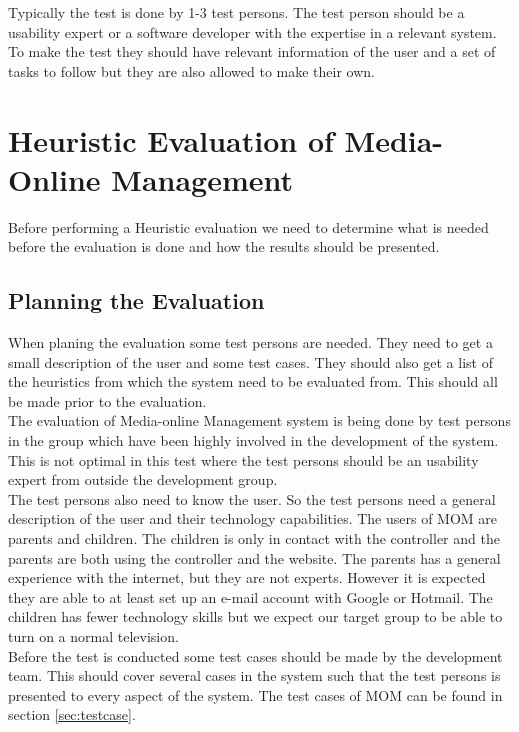 Typically the test is done by 1-3 test persons\citep{HeuristicEvaluation}. The test person should be a usability expert or a software developer with the expertise in a relevant system. To make the test they should have relevant information of the user and a set of tasks to follow but they are also allowed to make their own.


\section{Heuristic Evaluation of Media-Online Management}
Before performing a Heuristic evaluation we need to determine what is needed before the evaluation is done and how the results should be presented\citep{HeuristicEvaluationGuide}.

\subsection{Planning the Evaluation}
When planing the evaluation some test persons are needed. They need to get a small description of the user and some test cases. They should also get a list of the heuristics from which the system need to be evaluated from. This should all be made prior to the evaluation. \\

The evaluation of Media-online Management system is being done by test persons in the group which have been highly involved in the development of the system. This is not optimal in this test where the test persons should be an usability expert from outside the development group\citep{DIEB}.\\

The test persons also need to know the user. So the test persons need a general description of the user and their technology capabilities. The users of MOM are parents and children. The children is only in contact with the controller and the parents are both using the controller and the website. The parents has a general experience with the internet, but they are not experts. However it is expected they are able to at least set up an e-mail account with Google or Hotmail. The children has fewer technology skills but we expect our target group to be able to turn on a normal television. \\

Before the test is conducted some test cases should be made by the development team. This should cover several cases in the system such that the test persons is presented to every aspect of the system. The test cases of MOM can be found in section \vref{sec:testcase}.\\ 


